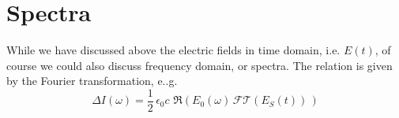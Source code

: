 \section{Spectra}

While we have discussed above the electric fields in time domain, i.e. $E(t)$, of course we could also discuss frequency domain, or spectra. The relation is given by the Fourier transformation, e..g.
\[
\Delta I (\omega) = \frac{1}{2} \, \epsilon_0 c \, \, \Re \left( E_0(\omega) \, \mathcal{FT} ( E_S(t) ) \, \right)
\]


\printbibliography[segment=\therefsegment,heading=subbibliography]
